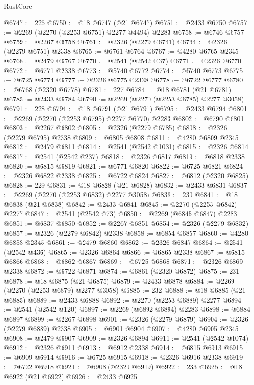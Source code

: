 \begin{lexlean}{RustCore}
\begin{coremodule}
@6747 := 226
@6750 := @18 @6747 (@21 @6747)
@6751 := @2433 @6750
@6757 := @2269 (@2270 (@2253 @6751) @2277 @4494) @2283
@6758 := @6746 @6757
@6759 := @2267 @6758
@6761 := @2326 (@2279 @6741)
@6764 := @2326 (@2279 @6751) @2338
@6765 := @6761 @6764
@6767 := @4280 @6765 @2345
@6768 := @2479 @6767
@6770 := @2541 (@2542 @37)
@6771 := @2326 @6770
@6772 := @6771 @2338
@6773 := @5740 @6772
@6774 := @5740 @6773
@6775 := @6725 @6774
@6777 := @2326 @6775 @2338
@6778 := @6722 @6777
@6780 := @6768 (@2320 @6778)
@6781 := 227
@6784 := @18 @6781 (@21 @6781)
@6785 := @2433 @6784
@6790 := @2269 (@2270 (@2253 @6785) @2277 @3058)
@6791 := 228
@6794 := @18 @6791 (@21 @6791)
@6795 := @2433 @6794
@6801 := @2269 (@2270 (@2253 @6795) @2277 @6770) @2283
@6802 := @6790 @6801
@6803 := @2267 @6802
@6805 := @2326 (@2279 @6785)
@6808 := @2326 (@2279 @6795) @2338
@6809 := @6805 @6808
@6811 := @4280 @6809 @2345
@6812 := @2479 @6811
@6814 := @2541 (@2542 @1031)
@6815 := @2326 @6814
@6817 := @2541 (@2542 @237)
@6818 := @2326 @6817
@6819 := @6818 @2338
@6820 := @6815 @6819
@6821 := @6771 @6820
@6822 := @6725 @6821
@6824 := @2326 @6822 @2338
@6825 := @6722 @6824
@6827 := @6812 (@2320 @6825)
@6828 := 229
@6831 := @18 @6828 (@21 @6828)
@6832 := @2433 @6831
@6837 := @2269 (@2270 (@2253 @6832) @2277 @3058)
@6838 := 230
@6841 := @18 @6838 (@21 @6838)
@6842 := @2433 @6841
@6845 := @2270 (@2253 @6842) @2277
@6847 := @2541 (@2542 @73)
@6850 := @2269 (@6845 @6847) @2283
@6851 := @6837 @6850
@6852 := @2267 @6851
@6854 := @2326 (@2279 @6832)
@6857 := @2326 (@2279 @6842) @2338
@6858 := @6854 @6857
@6860 := @4280 @6858 @2345
@6861 := @2479 @6860
@6862 := @2326 @6847
@6864 := @2541 (@2542 @436)
@6865 := @2326 @6864
@6866 := @6865 @2338
@6867 := @6815 @6866
@6868 := @6862 @6867
@6869 := @6725 @6868
@6871 := @2326 @6869 @2338
@6872 := @6722 @6871
@6874 := @6861 (@2320 @6872)
@6875 := 231
@6878 := @18 @6875 (@21 @6875)
@6879 := @2433 @6878
@6884 := @2269 (@2270 (@2253 @6879) @2277 @3058)
@6885 := 232
@6888 := @18 @6885 (@21 @6885)
@6889 := @2433 @6888
@6892 := @2270 (@2253 @6889) @2277
@6894 := @2541 (@2542 @120)
@6897 := @2269 (@6892 @6894) @2283
@6898 := @6884 @6897
@6899 := @2267 @6898
@6901 := @2326 (@2279 @6879)
@6904 := @2326 (@2279 @6889) @2338
@6905 := @6901 @6904
@6907 := @4280 @6905 @2345
@6908 := @2479 @6907
@6909 := @2326 @6894
@6911 := @2541 (@2542 @1074)
@6912 := @2326 @6911
@6913 := @6912 @2338
@6914 := @6815 @6913
@6915 := @6909 @6914
@6916 := @6725 @6915
@6918 := @2326 @6916 @2338
@6919 := @6722 @6918
@6921 := @6908 (@2320 @6919)
@6922 := 233
@6925 := @18 @6922 (@21 @6922)
@6926 := @2433 @6925

\end{coremodule}
\end{lexlean}
